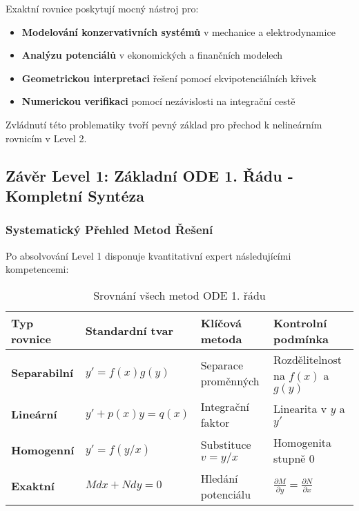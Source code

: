 \vspace{0.6\baselineskip}

\begin{conclusion}
Exaktní rovnice poskytují mocný nástroj pro:
\begin{itemize}
\item \textbf{Modelování konzervativních systémů} v mechanice a elektrodynamice
\item \textbf{Analýzu potenciálů} v ekonomických a finančních modelech  
\item \textbf{Geometrickou interpretaci} řešení pomocí ekvipotenciálních křivek
\item \textbf{Numerickou verifikaci} pomocí nezávislosti na integrační cestě
\end{itemize}
Zvládnutí této problematiky tvoří pevný základ pro přechod k nelineárním rovnicím v Level 2.
\end{conclusion}

\subsection{Závěr Level 1: Základní ODE 1. Řádu - Kompletní Syntéza}
\label{sec:zaver-level1}

\subsubsection{Systematický Přehled Metod Řešení}
\label{subsec:systematicky-prehled}

\begin{overview}
\label{over:kompletni-metodologie-level1}
Po absolvování Level 1 disponuje kvantitativní expert následujícími kompetencemi:

\begin{table}[h]
\centering
\caption{Srovnání všech metod ODE 1. řádu}
\label{tab:srovnani-vsech-metod}
\begin{tabular}{p{}p{}p{}p{}}
\toprule
\textbf{Typ rovnice} & \textbf{Standardní tvar} & \textbf{Klíčová metoda} & \textbf{Kontrolní podmínka} \\
\midrule
\textbf{Separabilní} & $y' = f(x)g(y)$ & Separace proměnných & Rozdělitelnost na $f(x)$ a $g(y)$ \\
\textbf{Lineární} & $y' + p(x)y = q(x)$ & Integrační faktor & Linearita v $y$ a $y'$ \\
\textbf{Homogenní} & $y' = f(y/x)$ & Substituce $v = y/x$ & Homogenita stupně 0 \\
\textbf{Exaktní} & $M dx + N dy = 0$ & Hledání potenciálu & $\frac{\partial M}{\partial y} = \frac{\partial N}{\partial x}$ \\
\bottomrule
\end{tabular}
\end{table}
\end{overview}

